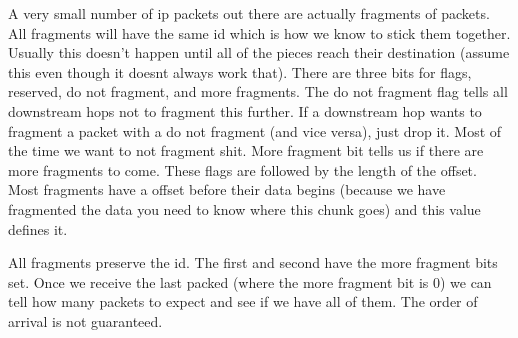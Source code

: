 \documentclass[12pt]{article}
\begin{document}

A very small number of ip packets out there are actually fragments of packets. All fragments will have the same id which is how we know to stick them together. Usually this doesn't happen until all of the pieces reach their destination (assume this even though it doesnt always work that). There are three bits for flags, reserved, do not fragment, and more fragments. The do not fragment flag tells all downstream hops not to fragment this further. If a downstream hop wants to fragment a packet with a do not fragment (and vice versa), just drop it. Most of the time we want to not fragment shit. More fragment bit tells us if there are more fragments to come. These flags are followed by the length of the offset. Most fragments have a offset before their data begins (because we have fragmented the data you need to know where this chunk goes) and this value defines it. 


All fragments preserve the id. The first and second have the more fragment bits set. Once we receive the last packed (where the more fragment bit is 0) we can tell how many packets to expect and see if we have all of them. The order of arrival is not guaranteed.


\end{document}
